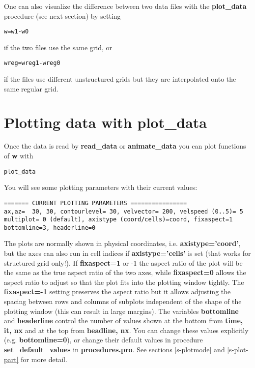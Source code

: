 \documentclass{article}
\begin{document}
One can also visualize the difference between two data files 
with the {\bf plot\_data} procedure (see next section) by setting
\begin{verbatim}
w=w1-w0
\end{verbatim}
   if the two files use the same grid, or
\begin{verbatim}
wreg=wreg1-wreg0
\end{verbatim}
if the files use different unstructured grids but they are 
interpolated onto the same regular grid.

\section{Plotting data with plot\_data \label{s-plot_data}}

   Once the data is read by {\bf read\_data} or {\bf animate\_data} you can plot 
   functions of {\bf w} with
\begin{verbatim}
plot_data
\end{verbatim}
   You will see some plotting parameters with their current values:
\begin{verbatim}
======= CURRENT PLOTTING PARAMETERS ================
ax,az=  30, 30, contourlevel= 30, velvector= 200, velspeed (0..5)= 5
multiplot= 0 (default), axistype (coord/cells)=coord, fixaspect=1
bottomline=3, headerline=0
\end{verbatim}
   The plots are normally shown in physical coordinates, i.e.
   {\bf axistype='coord'}, but the axes can also run in cell indices 
   if {\bf axistype='cells'} is set (that works for structured grid only!).
   If {\bf fixaspect=1} or -1 the aspect ratio of the plot will be the same
   as the true aspect ratio of the two axes, while {\bf fixaspect=0} allows
   the aspect ratio to adjust so that 
   the plot fits into the plotting window tightly. The {\bf fixaspect=-1}
   setting preserves the aspect ratio but it allows adjusting the spacing 
   between rows and columns of subplots independent of the shape
   of the plotting window (this can result in large margins).
   The variables {\bf bottomline} and {\bf headerline} control the number
   of values shown at the bottom from {\bf time, it, nx} and at the top 
   from {\bf headline, nx}.
   You can change these values explicitly (e.g. {\bf bottomline=0}), or change 
   their default values in procedure {\bf set\_default\_values} in {\bf procedures.pro}. 
   See sections \ref{s-plotmode} and \ref{s-plot-part} for more detail.
\end{document}
